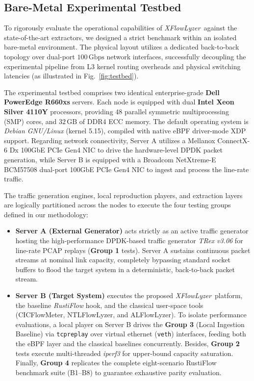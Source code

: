 \documentclass[conference]{IEEEtran}
\newcommand{\nome}{\textit{XFlowLyzer}\xspace}
\begin{document}
\subsection{Bare-Metal Experimental Testbed}
\label{subsec:testbed}

To rigorously evaluate the operational capabilities of \nome\ against the state-of-the-art extractors, we designed a strict benchmark within an isolated bare-metal environment. The physical layout utilizes a dedicated back-to-back topology over dual-port $100\,\text{Gbps}$ network interfaces, successfully decoupling the experimental pipeline from L3 kernel routing overheads and physical switching latencies (as illustrated in Fig.~\ref{fig:testbed}).

The experimental testbed comprises two identical enterprise-grade \textbf{Dell PowerEdge R660xs} servers. Each node is equipped with dual \textbf{Intel Xeon Silver 4110Y} processors, providing 48 parallel symmetric multiprocessing (SMP) cores, and $32\,\text{GB}$ of DDR4 ECC memory. The default operating system is \textit{Debian GNU/Linux} (kernel 5.15), compiled with native eBPF driver-mode XDP support. Regarding network connectivity, Server A utilizes a Mellanox ConnectX-6 Dx 100GbE PCIe Gen4 NIC to drive the hardware-level DPDK packet generation, while Server B is equipped with a Broadcom NetXtreme-E BCM57508 dual-port 100GbE PCIe Gen4 NIC to ingest and process the line-rate traffic.

The traffic generation engines, local reproduction players, and extraction layers are logically partitioned across the nodes to execute the four testing groups defined in our methodology:
\begin{itemize}
    \item \textbf{Server A (External Generator)} acts strictly as an active traffic generator hosting the high-performance DPDK-based traffic generator \textit{TRex v3.06} for line-rate PCAP replays (\textbf{Group 1} tests). Server A sustains continuous packet streams at nominal link capacity, completely bypassing standard socket buffers to flood the target system in a deterministic, back-to-back packet stream.
    \item \textbf{Server B (Target System)} executes the proposed \nome\ platform, the baseline \textit{RustiFlow} hook, and the classical user-space tools (CICFlowMeter, NTLFlowLyzer, and ALFlowLyzer). To isolate performance evaluations, a local player on Server B drives the \textbf{Group 3} (Local Ingestion Baseline) via \texttt{tcpreplay} over virtual ethernet (\texttt{veth}) interfaces, feeding both the eBPF layer and the classical baselines concurrently. Besides, \textbf{Group 2} tests execute multi-threaded \textit{iperf3} for upper-bound capacity saturation. Finally, \textbf{Group 4} replicates the complete eight-scenario RustiFlow benchmark suite (B1--B8) to guarantee exhaustive parity evaluation.
\end{itemize}
\end{document}
